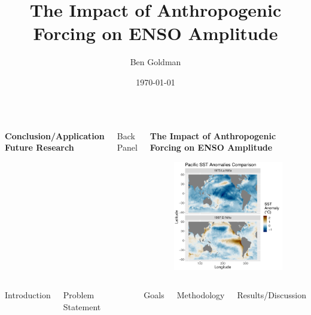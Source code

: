 \documentclass{beamer}
\title{The Impact of Anthropogenic Forcing on ENSO Amplitude}
\author{Ben Goldman}
\date{\today}
\begin{document}
\begin{frame}
  \begin{columns}
    \begin{block}{}
        \bf\huge{Conclusion/Application}
        \vspace{5in}
        \bf\huge{Future Research}
    \end{block}
    \begin{block}{Back Panel}
    \end{block}
    \begin{block}{}
      \begin{center}
        \bf\huge{The Impact of Anthropogenic Forcing on ENSO Amplitude}
      \end{center}
      \begin{figure}
        \includegraphics[width=\textwidth]{intro_fig}
      \end{figure}
    \end{block}
  \end{columns}
\end{frame}

\begin{frame}
  \begin{columns}
    \begin{block}{Introduction}
    \end{block}
    \begin{block}{Problem Statement}
    \end{block}
    \begin{block}{Goals}
    \end{block}
    \begin{block}{Methodology}
    \end{block}
    \begin{block}{Results/Discussion}
    \end{block}
  \end{columns}
\end{frame}
\end{document}
